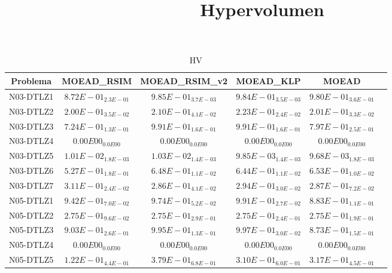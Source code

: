 \documentclass{article}
\title{Hypervolumen}
\author{}
\begin{document}
\maketitle
\begin{table*}[ht!]
\scriptsize
\caption{HV}
\centering\begin{tabular}{|c||c||c||c||c||c|} \hline
Problema &MOEAD_RSIM &MOEAD_RSIM_v2 &MOEAD_KLP &MOEAD\\\hline
N03-DTLZ1 &$8.72E-01_{2.3E-01}$ &\cellcolor{gray95}$9.85E-01_{3.7E-03}$ &\cellcolor{gray25}$9.84E-01_{3.5E-03}$ &$9.80E-01_{3.6E-01}$\\ 
\hline
N03-DTLZ2 &$2.00E-01_{3.5E-02}$ &\cellcolor{gray25}$2.10E-01_{4.1E-02}$ &\cellcolor{gray95}$2.23E-01_{2.4E-02}$ &$2.01E-01_{3.3E-02}$\\ 
\hline
N03-DTLZ3 &$7.24E-01_{1.3E-01}$ &\cellcolor{gray95}$9.91E-01_{1.6E-01}$ &\cellcolor{gray25}$9.91E-01_{1.6E-01}$ &$7.97E-01_{2.5E-01}$\\ 
\hline
N03-DTLZ4 &\cellcolor{gray95}$0.00E00_{0.0E00}$ &\cellcolor{gray25}$0.00E00_{0.0E00}$ &$0.00E00_{0.0E00}$ &$0.00E00_{0.0E00}$\\ 
\hline
N03-DTLZ5 &\cellcolor{gray25}$1.01E-02_{1.8E-03}$ &\cellcolor{gray95}$1.03E-02_{1.4E-03}$ &$9.85E-03_{1.4E-03}$ &$9.68E-03_{1.8E-03}$\\ 
\hline
N03-DTLZ6 &$5.27E-01_{1.8E-01}$ &\cellcolor{gray25}$6.48E-01_{1.1E-02}$ &$6.44E-01_{1.1E-02}$ &\cellcolor{gray95}$6.53E-01_{1.0E-02}$\\ 
\hline
N03-DTLZ7 &\cellcolor{gray95}$3.11E-01_{2.4E-02}$ &$2.86E-01_{4.1E-02}$ &\cellcolor{gray25}$2.94E-01_{3.0E-02}$ &$2.87E-01_{7.2E-02}$\\ 
\hline
N05-DTLZ1 &$9.42E-01_{7.0E-02}$ &\cellcolor{gray25}$9.74E-01_{5.2E-02}$ &\cellcolor{gray95}$9.91E-01_{2.7E-02}$ &$8.83E-01_{1.1E-01}$\\ 
\hline
N05-DTLZ2 &\cellcolor{gray95}$2.75E-01_{9.6E-02}$ &$2.75E-01_{2.9E-01}$ &$2.75E-01_{2.4E-01}$ &\cellcolor{gray25}$2.75E-01_{1.9E-01}$\\ 
\hline
N05-DTLZ3 &$9.03E-01_{2.6E-01}$ &\cellcolor{gray25}$9.95E-01_{1.3E-01}$ &\cellcolor{gray95}$9.97E-01_{3.0E-02}$ &$8.73E-01_{1.5E-01}$\\ 
\hline
N05-DTLZ4 &\cellcolor{gray95}$0.00E00_{0.0E00}$ &\cellcolor{gray25}$0.00E00_{0.0E00}$ &$0.00E00_{0.0E00}$ &$0.00E00_{0.0E00}$\\ 
\hline
N05-DTLZ5 &$1.22E-01_{4.4E-01}$ &\cellcolor{gray95}$3.79E-01_{6.8E-01}$ &$3.10E-01_{6.0E-01}$ &\cellcolor{gray25}$3.17E-01_{4.5E-01}$\\ 

\end{tabular}
\end{table*}
\end{document}
